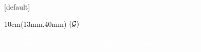 \documentclass{beamer}
\begin{document}
[default] 
\setbeamertemplate{footline}{
\hspace{2cm}  \raisebox{2.5ex}
    {{}}\hfill 
  \raisebox{2.5ex}
  {{ \null }}}
\begin{frame}\begin{textblock*}{10cm}(13mm,40mm)
{\textcolor{white} {
{$(\mathcal{G})$}\\[2mm]
   { \huge semi-supervised learning  with graphs and harmonic functions}\\[3mm]
	{\Large \dots our running example for learning with graphs}}}
	\end{textblock*}
\vspace*{-4pt}\end{frame}\MakeNormalSlide
\end{document}
